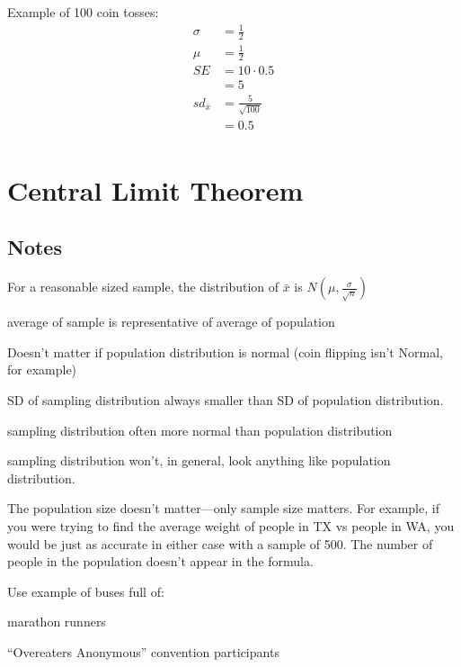 \documentclass[portrait]{exam}
\begin{document}
  Example of 100 coin tosses:
  \begin{align*}
    \sigma        & = \frac{1}{2} \\
    \mu           & = \frac{1}{2} \\
    SE            & = 10 \cdot 0.5 \\
                  & = 5 \\
     sd_{\bar{x}} & = \frac{5}{\sqrt{100}} \\
                  & = 0.5 \\
  \end{align*}

  \section{Central Limit Theorem}
  \subsection{Notes}

  For a reasonable sized sample, the distribution of $\bar{x}$ is $N(\mu,
  \frac{\sigma}{\sqrt{n}})$

  \begin{itemize*}
    \item average of sample is representative of average of population
    \item Doesn't matter if population distribution is normal (coin flipping
      isn't Normal, for example)
    \item SD of sampling distribution always smaller than SD of population
      distribution.
    \item sampling distribution often more normal than population distribution

    \item sampling distribution won't, in general, look anything like population
      distribution.
  \end{itemize*}

  The population size doesn't matter---only sample size matters. For example, if
  you were trying to find the average weight of people in TX vs people in WA,
  you would be just as accurate in either case with a sample of 500. The number
  of people in the population doesn't appear in the formula.

  Use example of buses full of:
  \begin{itemize*}
    \item marathon runners
    \item ``Overeaters Anonymous'' convention participants
  \end{itemize*}
\end{document}
